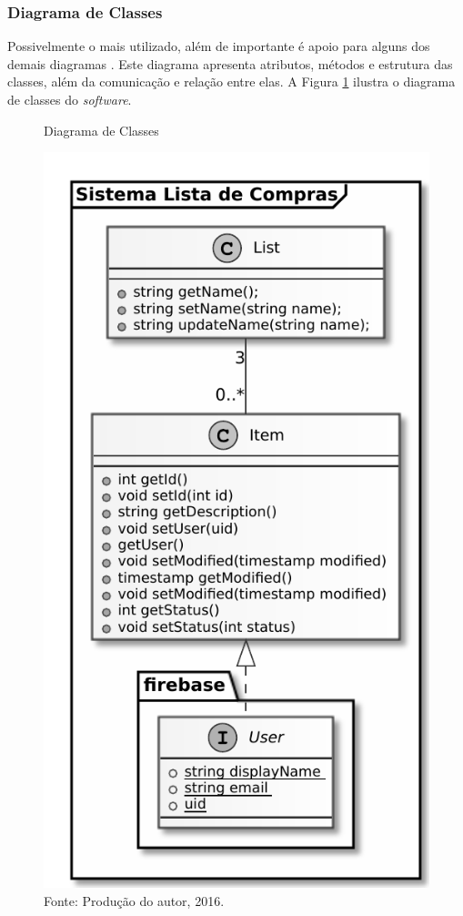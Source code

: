 \documentclass[
	12pt,
	openright,
	oneside, %
	a4paper,
	chapter=TITLE,
	section=TITLE,
	english,
	brazil %
	]{abntex2-udesc}
\begin{document}
\subsubsection{Diagrama de Classes}

Possivelmente o mais utilizado, além de importante é apoio para alguns dos demais diagramas \cite{guedes2011}. Este diagrama apresenta atributos, métodos e estrutura das classes, além da comunicação e relação entre elas. A Figura \ref{fig:classes} ilustra o diagrama de classes do \textit{software}.

\begin{figure}[h]
\caption{Diagrama de Classes}\label{fig:classes}
\centering
\includegraphics{figures/classes.pdf}
\caption*{\footnotesize Fonte: Produção do autor, 2016.}
\end{figure}
\end{document}
